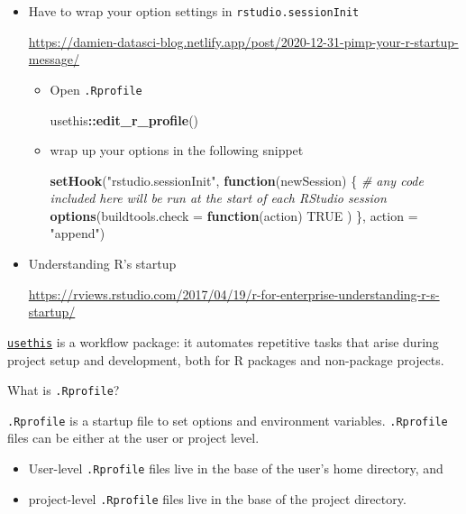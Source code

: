 \documentclass[
]{book}
\newenvironment{Shaded}{\begin{snugshade}}{\end{snugshade}}
\newcommand{\AttributeTok}[1]{\textcolor[rgb]{0.13,0.29,0.53}{#1}}
\newcommand{\CommentTok}[1]{\textcolor[rgb]{0.56,0.35,0.01}{\textit{#1}}}
\newcommand{\ConstantTok}[1]{\textcolor[rgb]{0.56,0.35,0.01}{#1}}
\newcommand{\ControlFlowTok}[1]{\textcolor[rgb]{0.13,0.29,0.53}{\textbf{#1}}}
\newcommand{\FunctionTok}[1]{\textcolor[rgb]{0.13,0.29,0.53}{\textbf{#1}}}
\newcommand{\NormalTok}[1]{#1}
\newcommand{\SpecialCharTok}[1]{\textcolor[rgb]{0.81,0.36,0.00}{\textbf{#1}}}
\newcommand{\StringTok}[1]{\textcolor[rgb]{0.31,0.60,0.02}{#1}}
\providecommand{\tightlist}{%
  \setlength{\itemsep}{0pt}\setlength{\parskip}{0pt}}
\theoremstyle{definition}
\theoremstyle{definition}
\theoremstyle{definition}
\theoremstyle{definition}
\theoremstyle{remark}
\begin{document}
\begin{itemize}
\item
  Have to {wrap your option settings in \texttt{rstudio.sessionInit}}

  \url{https://damien-datasci-blog.netlify.app/post/2020-12-31-pimp-your-r-startup-message/}

  \begin{itemize}
  \item
    Open \texttt{.Rprofile}

\begin{Shaded}
\begin{Highlighting}[]
\NormalTok{usethis}\SpecialCharTok{::}\FunctionTok{edit\_r\_profile}\NormalTok{()}
\end{Highlighting}
\end{Shaded}
  \item
    wrap up your options in the following snippet

\begin{Shaded}
\begin{Highlighting}[]
\FunctionTok{setHook}\NormalTok{(}\StringTok{"rstudio.sessionInit"}\NormalTok{, }\ControlFlowTok{function}\NormalTok{(newSession) \{}
  \CommentTok{\# any code included here will be run at the start of each RStudio session}
  \FunctionTok{options}\NormalTok{(}\AttributeTok{buildtools.check =} \ControlFlowTok{function}\NormalTok{(action) }\ConstantTok{TRUE}\NormalTok{ )}
\NormalTok{\}, }\AttributeTok{action =} \StringTok{"append"}\NormalTok{)}
\end{Highlighting}
\end{Shaded}
  \end{itemize}
\item
  Understanding R's startup

  \url{https://rviews.rstudio.com/2017/04/19/r-for-enterprise-understanding-r-s-startup/}
\end{itemize}

\href{https://usethis.r-lib.org/reference/index.html}{\texttt{usethis}} is a workflow package: it automates repetitive tasks that arise during project setup and development, both for R packages and non-package projects.

What is \texttt{.Rprofile}?

\texttt{.Rprofile} is a startup file to set options and environment variables. \texttt{.Rprofile} files can be either at the user or project level.

\begin{itemize}
\tightlist
\item
  User-level \texttt{.Rprofile} files live in the base of the user's {home directory}, and
\item
  project-level \texttt{.Rprofile} files live in the base of the project directory.
\end{itemize}
\end{document}
